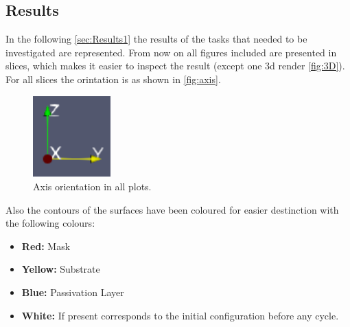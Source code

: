 \documentclass[12pt,a4paper]{article}
\begin{document}
\subsection{Results}\label{sec:Results1}
In the following \autoref{sec:Results1} the results of the tasks that needed to be investigated
 are represented. From now on all figures included are presented in slices, which makes it easier to inspect the result (except one 3d render \autoref{fig:3D}). For all slices the orintation is as shown in \autoref{fig:axis}.
 \begin{figure}[H]
	\centering \includegraphics[width=3cm]{figures/axis_label.png}
	\caption{Axis orientation in all plots.} 
    \label{fig:axis}
\end{figure}
Also the contours of the surfaces have been coloured for easier destinction with the following colours:
\begin{itemize}
    \item \textbf{Red: }Mask
    \item \textbf{Yellow: }Substrate
    \item \textbf{Blue: }Passivation Layer
    \item \textbf{White: }If present corresponds to the initial configuration before any cycle.
\end{itemize}
\end{document}
